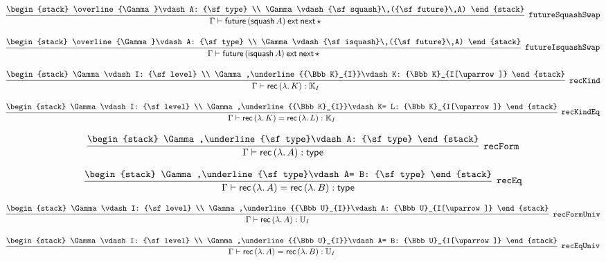 \[
\infer[{\tt futureSquashSwap}]{\Gamma \vdash {\sf future}\,({\sf squash}\,A)\:{\sf ext}\:{\sf next}\,\star }{
\begin{stack}
\overline{\Gamma}\vdash A: {\sf type}
\\
\Gamma \vdash {\sf squash}\,({\sf future}\,A)
\end{stack}}
\]

\[
\infer[{\tt futureIsquashSwap}]{\Gamma \vdash {\sf future}\,({\sf isquash}\,A)\:{\sf ext}\:{\sf next}\,\star }{
\begin{stack}
\overline{\Gamma}\vdash A: {\sf type}
\\
\Gamma \vdash {\sf isquash}\,({\sf future}\,A)
\end{stack}}
\]

\[
\infer[{\tt recKind}]{\Gamma \vdash {\sf rec}\,(\lambda .\,K): {\Bbb K}_{I}}{
\begin{stack}
\Gamma \vdash I: {\sf level}
\\
\Gamma ,\underline{{\Bbb K}_{I}}\vdash K: {\Bbb K}_{I[\uparrow ]}
\end{stack}}
\]

\[
\infer[{\tt recKindEq}]{\Gamma \vdash {\sf rec}\,(\lambda .\,K)= {\sf rec}\,(\lambda .\,L): {\Bbb K}_{I}}{
\begin{stack}
\Gamma \vdash I: {\sf level}
\\
\Gamma ,\underline{{\Bbb K}_{I}}\vdash K= L: {\Bbb K}_{I[\uparrow ]}
\end{stack}}
\]

\[
\infer[{\tt recForm}]{\Gamma \vdash {\sf rec}\,(\lambda .\,A): {\sf type}}{
\begin{stack}
\Gamma ,\underline{\sf type}\vdash A: {\sf type}
\end{stack}}
\]

\[
\infer[{\tt recEq}]{\Gamma \vdash {\sf rec}\,(\lambda .\,A)= {\sf rec}\,(\lambda .\,B): {\sf type}}{
\begin{stack}
\Gamma ,\underline{\sf type}\vdash A= B: {\sf type}
\end{stack}}
\]

\[
\infer[{\tt recFormUniv}]{\Gamma \vdash {\sf rec}\,(\lambda .\,A): {\Bbb U}_{I}}{
\begin{stack}
\Gamma \vdash I: {\sf level}
\\
\Gamma ,\underline{{\Bbb U}_{I}}\vdash A: {\Bbb U}_{I[\uparrow ]}
\end{stack}}
\]

\[
\infer[{\tt recEqUniv}]{\Gamma \vdash {\sf rec}\,(\lambda .\,A)= {\sf rec}\,(\lambda .\,B): {\Bbb U}_{I}}{
\begin{stack}
\Gamma \vdash I: {\sf level}
\\
\Gamma ,\underline{{\Bbb U}_{I}}\vdash A= B: {\Bbb U}_{I[\uparrow ]}
\end{stack}}
\]

